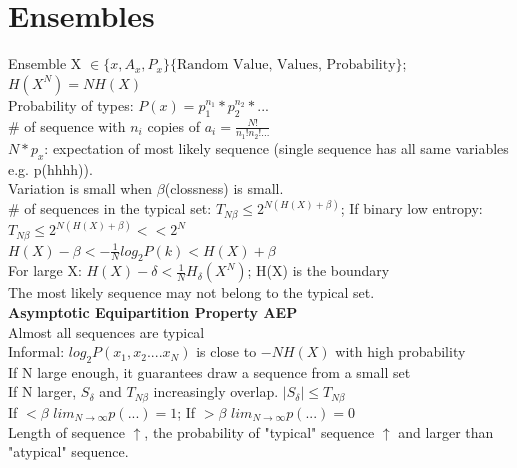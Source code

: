 \documentclass[12pt,a4paper]{extarticle}
\begin{document}
\section{Ensembles}
Ensemble X $\in \{x,A_x,P_x\}\{\text{Random Value, Values, Probability}\}$;\\
$H(X^N)=NH(X)$\\
Probability of types: $P(x)=p_1^{n_1}*p_2^{n_2}*...  $\\
$\#$ of sequence with $n_i$ copies of $a_i= \frac{N!}{n_1!n_2!...}$\\
$N*p_x$: expectation of most likely sequence (single sequence has all same variables e.g. p(hhhh)).\\
Variation is small when $\beta$(clossness) is small.\\
$\#$ of sequences in the typical set: $T_{N\beta}\leq 2^{N(H(X)+\beta)}$; If binary low entropy: $T_{N\beta}\leq 2^{N(H(X)+\beta)}<<2^N$\\
$H(X)-\beta <-\frac{1}{N}log_2P(k)<H(X)+ \beta$\\
For large X: $H(X)-\delta < \frac{1}{N}H_\delta (X^N)$; H(X) is the boundary\\
The most likely sequence may not belong to the typical set.\\
\textbf{Asymptotic Equipartition Property AEP}\\
Almost all sequences are typical\\
Informal: $log_2 P(x_1,x_2....x_N)$ is close to $-NH(X)$ with high probability\\
If N large enough, it guarantees draw a sequence from a small set\\
If N larger, $S_\delta $ and $T_{N\beta}$ increasingly overlap. $|S_\delta|\leq T_{N\beta}$\\
If $<\beta$ $lim_{N\to \infty}p(...)=1$; If $>\beta$ $lim_{N\to \infty}p(...)=0$\\
Length of sequence $\uparrow$, the probability of "typical" sequence $\uparrow$ and larger than "atypical" sequence.
\end{document}
